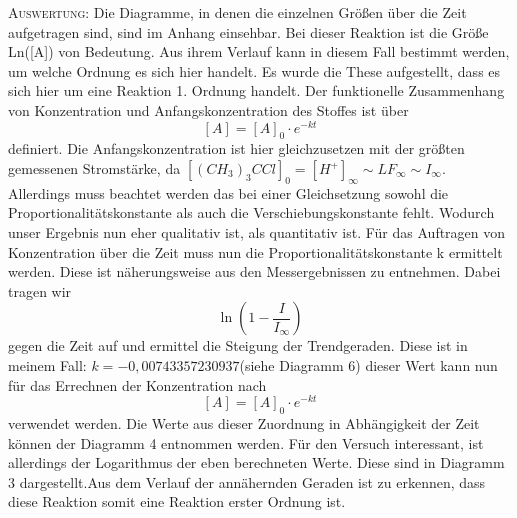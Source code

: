 \documentclass[11pt, a4paper]{article}
\begin{document}
\textsc{Auswertung:}\hspace{8mm} Die Diagramme, in denen die einzelnen Größen über die Zeit aufgetragen sind, sind im Anhang einsehbar. Bei dieser Reaktion ist die Größe Ln([A]) von Bedeutung. Aus ihrem Verlauf kann in diesem Fall bestimmt werden, um welche Ordnung es sich hier handelt. Es wurde die These aufgestellt, dass es sich hier um eine Reaktion 1. Ordnung handelt. Der funktionelle Zusammenhang von Konzentration und Anfangskonzentration des Stoffes ist über $$[A] = [A]_0 \cdot e^{-kt}$$ definiert. Die Anfangskonzentration ist hier gleichzusetzen mit der größten gemessenen Stromstärke, da $[(CH_3)_3CCl]_0 = [H^+]_\infty\sim LF_\infty \sim I_\infty$. Allerdings muss beachtet werden das bei einer Gleichsetzung sowohl die Proportionalitätskonstante als auch die Verschiebungskonstante fehlt. Wodurch unser Ergebnis nun eher qualitativ ist, als quantitativ ist. Für das Auftragen von Konzentration über die Zeit muss nun die Proportionalitätskonstante k ermittelt werden. Diese ist näherungsweise aus den Messergebnissen zu entnehmen. Dabei tragen wir $$\ln\left(1-\frac{I}{I_\infty}\right)$$ gegen die Zeit auf und ermittel die Steigung der Trendgeraden. Diese ist in meinem Fall: $k=-0,00743357230937$(siehe Diagramm 6) dieser Wert kann nun für das Errechnen der Konzentration nach $$[A] = [A]_0\cdot e^{-kt}$$ verwendet werden. Die Werte aus dieser Zuordnung in Abhängigkeit der Zeit können der Diagramm 4 entnommen werden. Für den Versuch interessant, ist allerdings der Logarithmus der eben berechneten Werte. Diese sind in Diagramm 3 dargestellt.Aus dem Verlauf der annähernden Geraden ist zu erkennen, dass diese Reaktion somit eine Reaktion erster Ordnung ist.\\ 


\end{document}
